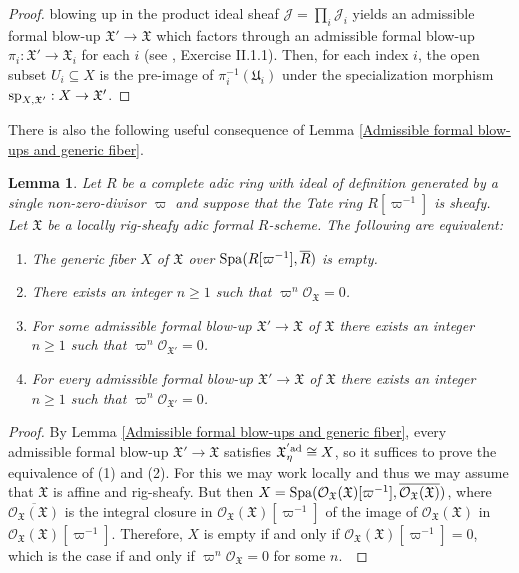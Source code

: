 \documentclass[12pt,twoside,a4paper]{article}
\newtheorem{lemma}[thm]{Lemma}
\theoremstyle{definition}
\theoremstyle{remark}
\newcommand\ad{{\rm ad}}
\newcommand\spc{{\rm sp}}
\newcommand\Spa{{\rm Spa}}
\begin{document}
\begin{proof}
blowing up in the product ideal sheaf $\mathcal{J}=\prod_{i}\mathcal{J}_{i}$ yields an admissible formal blow-up $\mathfrak{X}'\to\mathfrak{X}$ which factors through an admissible formal blow-up $\pi_{i}: \mathfrak{X}'\to \mathfrak{X}_{i}$ for each $i$ (see \cite{FK}, Exercise II.1.1). Then, for each index $i$, the open subset $U_{i}\subseteq X$ is the pre-image of $\pi_{i}^{-1}(\mathfrak{U}_{i})$ under the specialization morphism $\spc_{X,\mathfrak{X}'}: X\to \mathfrak{X}'$.\end{proof}
There is also the following useful consequence of Lemma \ref{Admissible formal blow-ups and generic fiber}.
\begin{lemma}\label{Empty generic fiber}Let $R$ be a complete adic ring with ideal of definition generated by a single non-zero-divisor $\varpi$ and suppose that the Tate ring $R[\varpi^{-1}]$ is sheafy. Let $\mathfrak{X}$ be a locally rig-sheafy adic formal $R$-scheme. The following are equivalent: 
\begin{enumerate}[(1)]\item The generic fiber $X$ of $\mathfrak{X}$ over $\Spa(R[\varpi^{-1}], \overline{R})$ is empty. \item There exists an integer $n\geq1$ such that $\varpi^{n}\mathcal{O}_{\mathfrak{X}}=0$. \item For some admissible formal blow-up $\mathfrak{X}'\to\mathfrak{X}$ of $\mathfrak{X}$ there exists an integer $n\geq1$ such that $\varpi^{n}\mathcal{O}_{\mathfrak{X}'}=0$. \item For every admissible formal blow-up $\mathfrak{X}'\to\mathfrak{X}$ of $\mathfrak{X}$ there exists an integer $n\geq1$ such that $\varpi^{n}\mathcal{O}_{\mathfrak{X}'}=0$. \end{enumerate}\end{lemma}
\begin{proof}By Lemma \ref{Admissible formal blow-ups and generic fiber}, every admissible formal blow-up $\mathfrak{X}'\to\mathfrak{X}$ satisfies $\mathfrak{X}_{\eta}^{'\ad}\cong X$, so it suffices to prove the equivalence of (1) and (2). For this we may work locally and thus we may assume that $\mathfrak{X}$ is affine and rig-sheafy. But then $X=\Spa(\mathcal{O}_{\mathfrak{X}}(\mathfrak{X})[\varpi^{-1}], \overline{\mathcal{O}_{\mathfrak{X}}(\mathfrak{X})})$, where $\overline{\mathcal{O}_{\mathfrak{X}}(\mathfrak{X})}$ is the integral closure in $\mathcal{O}_{\mathfrak{X}}(\mathfrak{X})[\varpi^{-1}]$ of the image of $\mathcal{O}_{\mathfrak{X}}(\mathfrak{X})$ in $\mathcal{O}_{\mathfrak{X}}(\mathfrak{X})[\varpi^{-1}]$. Therefore, $X$ is empty if and only if $\mathcal{O}_{\mathfrak{X}}(\mathfrak{X})[\varpi^{-1}]=0$, which is the case if and only if $\varpi^{n}\mathcal{O}_{\mathfrak{X}}=0$ for some $n$. \end{proof}
\end{document}

